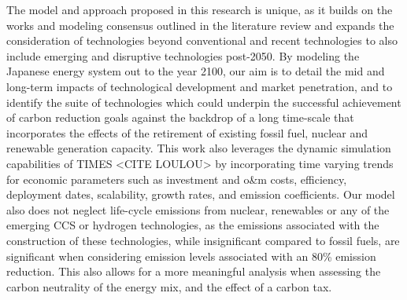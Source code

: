 The model and approach proposed in this research is unique, as it builds on the works and modeling consensus outlined in the literature review and expands the consideration of technologies beyond conventional and recent technologies to also include emerging and disruptive technologies post-2050. By modeling the Japanese energy system out to the year 2100, our aim is to detail the mid and long-term impacts of technological development and market penetration, and to identify the suite of technologies which could underpin the successful achievement of carbon reduction goals against the backdrop of a long time-scale that incorporates the effects of the retirement of existing fossil fuel, nuclear and renewable generation capacity. This work also leverages the dynamic simulation capabilities of TIMES <CITE LOULOU> by incorporating time varying trends for economic parameters such as investment and o&m costs, efficiency, deployment dates, scalability, growth rates, and emission coefficients. Our model also does not neglect life-cycle emissions from nuclear, renewables or any of the emerging CCS or hydrogen technologies, as the emissions associated with the construction of these technologies, while insignificant compared to fossil fuels, are significant when considering emission levels associated with an 80\% emission reduction. This also allows for a more meaningful analysis when assessing the carbon neutrality of the energy mix, and the effect of a carbon tax.
